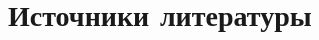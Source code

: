 \documentclass[12pt]{article}
\begin{document}


\setcounter{page}{2}
\tableofcontents
\newpage





\section{Источники литературы}

\printbibliography[heading=none]

\appendix

\end{document}
